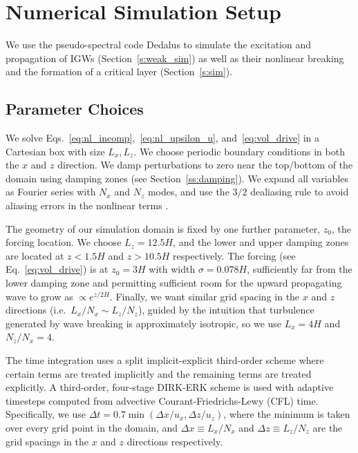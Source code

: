 \documentclass[
        fleqn,
        usenatbib,
        referee,
    ]{mnras}
\begin{document}
\section{Numerical Simulation Setup}\label{s:numerics}

We use the pseudo-spectral code Dedalus \citep{dedalus,dedalus2} to simulate
the excitation and propagation of IGWs (Section~\ref{s:weak_sim}) as well as
their nonlinear breaking and the formation of a critical layer
(Section~\ref{s:sim}).

\subsection{Parameter Choices}\label{ss:params}

We solve Eqs.~\eqref{eq:nl_incomp},~\eqref{eq:nl_upsilon_u},
and~\eqref{eq:vol_drive} in a Cartesian box with size $L_x, L_z$. We choose
periodic boundary conditions in both the $x$ and $z$ direction. We damp
perturbations to zero near the top/bottom of the domain using damping zones
(see Section~\ref{ss:damping}). We expand all variables as Fourier series
with $N_x$ and $N_z$ modes, and use the $3/2$ dealiasing rule to avoid aliasing
errors in the nonlinear terms \citep{boyd}.

The geometry of our simulation domain is fixed by one further parameter, $z_0$,
the forcing location. We choose $L_z = 12.5H$, and the lower and upper damping
zones are located at $z < 1.5H$ and $z > 10.5H$ respectively. The forcing (see
Eq.~\eqref{eq:vol_drive}) is at $z_0 = 3H$ with width $\sigma = 0.078H$,
sufficiently far from the lower damping zone and permitting sufficient room for
the upward propagating wave to grow as $\propto e^{z/2H}$. Finally, we want
similar grid spacing in the $x$ and $z$ directions (i.e.\ $L_x / N_x \sim L_z
/N_z$), guided by the intuition that turbulence generated by wave breaking is
approximately isotropic, so we use $L_x = 4H$ and $N_z / N_x = 4$.

The time integration uses a split implicit-explicit third-order scheme where
certain terms are treated implicitly and the remaining terms are treated
explicitly. A third-order, four-stage DIRK-ERK scheme \citep{ascher} is used
with adaptive timesteps computed from advective Courant-Friedrichs-Lewy (CFL)
time. Specifically, we use $\Delta t = 0.7 \min(\Delta x / u_x,\Delta z /
u_{z})$, where the minimum is taken over every grid point in the domain, and
$\Delta x \equiv L_x / N_x$ and $\Delta z \equiv L_z / N_z$ are the grid
spacings in the $x$ and $z$ directions respectively.
\end{document}
